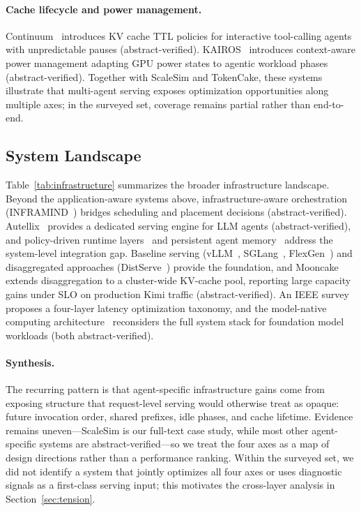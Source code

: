 \paragraph*{Cache lifecycle and power management.}
Continuum~\cite{continuum2025} introduces KV cache TTL policies for interactive tool-calling agents with unpredictable pauses (abstract-verified). KAIROS~\cite{kairos2026} introduces context-aware power management adapting GPU power states to agentic workload phases (abstract-verified). Together with ScaleSim and TokenCake, these systems illustrate that multi-agent serving exposes optimization opportunities along multiple axes; in the surveyed set, coverage remains partial rather than end-to-end.

\subsection{System Landscape}\label{sec:infra_landscape}

Table~\ref{tab:infrastructure} summarizes the broader infrastructure landscape. Beyond the application-aware systems above, infrastructure-aware orchestration (INFRAMIND~\cite{inframind2026}) bridges scheduling and placement decisions (abstract-verified). Autellix~\cite{autellix2025} provides a dedicated serving engine for LLM agents (abstract-verified), and policy-driven runtime layers~\cite{policyruntime2026} and persistent agent memory~\cite{agentmemory2026} address the system-level integration gap. Baseline serving (vLLM~\cite{kwon2023}, SGLang~\cite{sglang2024}, FlexGen~\cite{flexgen2023}) and disaggregated approaches (DistServe~\cite{distserve2024}) provide the foundation, and Mooncake~\cite{mooncake2025} extends disaggregation to a cluster-wide KV-cache pool, reporting large capacity gains under SLO on production Kimi traffic (abstract-verified). An IEEE survey~\cite{latencysurvey2026} proposes a four-layer latency optimization taxonomy, and the model-native computing architecture~\cite{modelnative2026} reconsiders the full system stack for foundation model workloads (both abstract-verified).

\paragraph*{Synthesis.} The recurring pattern is that agent-specific infrastructure gains come from exposing structure that request-level serving would otherwise treat as opaque: future invocation order, shared prefixes, idle phases, and cache lifetime. Evidence remains uneven---ScaleSim is our full-text case study, while most other agent-specific systems are abstract-verified---so we treat the four axes as a map of design directions rather than a performance ranking. Within the surveyed set, we did not identify a system that jointly optimizes all four axes or uses diagnostic signals as a first-class serving input; this motivates the cross-layer analysis in Section~\ref{sec:tension}.

